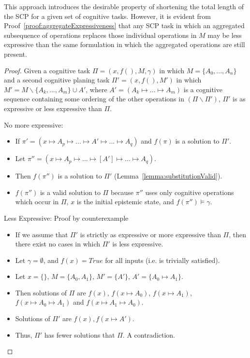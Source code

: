 \documentclass[
11pt, %
english, %
singlespacing, %
headsepline, %
]{MastersDoctoralThesis} %
\newtheorem{proof}{Proof}
\begin{document}
This approach introduces the desirable property of shortening the total length of the SCP for a given set of cognitive tasks. However, it is evident from Proof~\ref{proof:aggregateExpressiveness} that any SCP task in which an aggregated subsequence of operations replaces those individual operations in $M$ may be less expressive than the same formulation in which the aggregated operations are still present.

\begin{proof} \label{proof:aggregateExpressiveness}
Given a cognitive task $\Pi=(x,f(), M, \gamma)$ in which $M=\{A_0,...,A_n\}$ and a second cognitive planing task $\Pi'=(x,f(),M')$ in which $M'= M \smallsetminus \{A_k,...,A_m\} \cup A'$, where $A'=(A_k \longmapsto... \longmapsto A_m)$ is a cognitive sequence containing some ordering of the other operations in $(\Pi \smallsetminus \Pi')$, $\Pi'$ is as expressive or less expressive than $\Pi$.

\item No more expressive:
\begin{itemize}
\item If $\pi' = (x\longmapsto A_p \longmapsto ... \longmapsto A' \longmapsto ... \longmapsto A_q)$ and $f(\pi)$ is a solution to $\Pi'$.
\item Let $\pi'' = (x\longmapsto A_p \longmapsto ... \longmapsto [A'] \longmapsto ... \longmapsto A_q)$.
\item Then $f(\pi'')$ is a solution to $\Pi'$ (Lemma~\ref{lemma:substitutionValid}).
\item $f(\pi'')$ is a valid solution to $\Pi$ because $\pi''$ uses only cognitive operations which occur in $\Pi$, $x$ is the initial epistemic state, and $f(\pi'') \models \gamma$. 
\end{itemize}

\item Less Expressive: Proof by counterexample
\begin{itemize}
\item If we assume that $\Pi'$ is strictly as expressive or more expressive than $\Pi$, then there exist no cases in which $\Pi'$ is less expressive.
\item Let $\gamma = \emptyset$, and $f(x)=True$ for all inputs (i.e. is trivially satisfied).
\item Let $x=\{\}$, $M=\{A_0,A_1\}$, $M'=\{A'\}$, $A'=\{A_0\longmapsto A_1\}$.
\item Then solutions of $\Pi$ are $f(x)$, $f(x \longmapsto A_0)$, $f(x \longmapsto A_1)$, $f(x \longmapsto A_0\longmapsto A_1)$ and $f(x \longmapsto A_1\longmapsto A_0)$.
\item Solutions of $\Pi'$ are $f(x), f(x \longmapsto A')$.
\item Thus, $\Pi'$ has fewer solutions that $\Pi$. A contradiction.
\end{itemize}
\end{proof}
\end{document}

